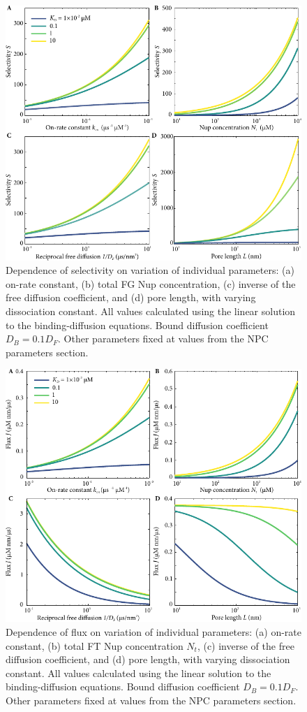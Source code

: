 \begin{figure}
\centering
\includegraphics[width=0.7\linewidth]{figs/ch02/parameter-variations.pdf}
\caption[Dependence of selectivity on model parameters.]{Dependence of selectivity on variation of individual
  parameters: (a) on-rate constant, (b) total FG Nup concentration, (c) inverse of the free diffusion coefficient, and (d) pore
  length, with varying dissociation constant. All values calculated using the linear solution to the binding-diffusion equations.  Bound diffusion coefficient $D_B = 0.1D_F$. Other parameters fixed at values from the NPC parameters section.}
\label{fig:parameter-variations}
\end{figure}

\begin{figure}
\centering
\includegraphics[width=0.7\linewidth]{figs/ch02/parameter-variations-abs-flux.pdf}
\caption[Dependence of absolute flux on model parameters.]{Dependence of flux on variation of individual parameters: (a)
  on-rate constant, (b) total FT Nup concentration $N_t$, (c) inverse
  of the free diffusion coefficient, and (d) pore length, with varying
  dissociation constant. All values calculated using the linear solution to the binding-diffusion equations. Bound diffusion coefficient $D_B = 0.1D_F$. Other parameters fixed at values from the NPC parameters section.}
\label{fig:parameter-variations-abs-flux}
\end{figure}


